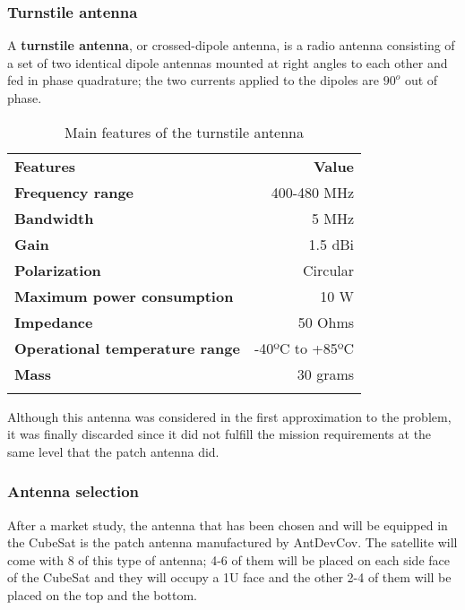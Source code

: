 \subsubsection{Turnstile antenna}

A \textbf{turnstile antenna}, or crossed-dipole antenna, is a radio antenna consisting of a set of two identical dipole antennas mounted at right angles to each other and fed in phase quadrature; the two currents applied to the dipoles are $90^o$ out of phase.

\pagebreak
\begin{longtable}{| l | r |}

\hline
\rowcolor[gray]{0.60} \multicolumn{2}{|c|}{\textbf{Turnstile antenna ANT430}} \\
\hline

\hline
\rowcolor[gray]{0.75}	\textbf{Features} &  \textbf{Value}   \\
\hline

\cellcolor[gray]{0.85} \textbf{Frequency range} & 400-480 MHz  \\
\cellcolor[gray]{0.85} \textbf{Bandwidth} & 5 MHz \\
\cellcolor[gray]{0.85} \textbf{Gain} & 1.5 dBi \\
\cellcolor[gray]{0.85} \textbf{Polarization} & Circular \\
\cellcolor[gray]{0.85} \textbf{Maximum power consumption} & 10 W \\
\cellcolor[gray]{0.85} \textbf{Impedance} & 50 Ohms \\
\cellcolor[gray]{0.85} \textbf{Operational temperature range} & -40ºC to +85ºC \\
\cellcolor[gray]{0.85} \textbf{Mass} & 30 grams \\
\hline

\caption{Main features of the turnstile antenna}
\label{turnstileantenna}

\end{longtable}

Although this antenna was considered in the first approximation to the problem, it was finally discarded since it did not fulfill the mission requirements at the same level that the patch antenna did.

\subsubsection{Antenna selection}
After a market study, the antenna that has been chosen and will be equipped in the CubeSat is the patch antenna manufactured by AntDevCov. The satellite will come with 8 of this type of antenna; 4-6 of them will be placed on each side face of the CubeSat and they will occupy a 1U face and the other 2-4 of them will be placed on the top and the bottom.

